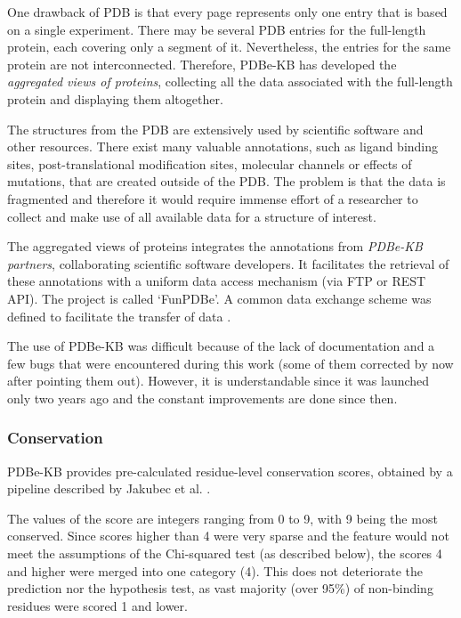 One drawback of PDB is that every page represents only one entry that is based on a single experiment. There may be several PDB entries for the full-length protein, each covering only a segment of it. Nevertheless, the entries for the same protein are not interconnected. Therefore, PDBe-KB has developed the \textit{aggregated views of proteins}, collecting all the data associated with the full-length protein and displaying them altogether.

The structures from the PDB are extensively used by scientific software and other resources. There exist many valuable annotations, such as ligand binding sites, post-translational modification sites, molecular channels or effects of mutations, that are created outside of the PDB. The problem is that the data is fragmented and therefore it would require immense effort of a researcher to collect and make use of all available data for a structure of interest.

The aggregated views of proteins integrates the annotations from \textit{PDBe-KB partners}, collaborating scientific software developers. It facilitates the retrieval of these annotations with a uniform data access mechanism (via FTP or REST API). The project is called `FunPDBe'. A common data exchange scheme was defined to facilitate the transfer of data \cite{pdbekb}.

The use of PDBe-KB was difficult because of the lack of documentation and a few bugs that were encountered during this work (some of them corrected by now after pointing them out). However, it is understandable since it was launched only two years ago and the constant improvements are done since then.

\subsubsection{Conservation}
PDBe-KB provides pre-calculated residue-level conservation scores, obtained by a pipeline described by Jakubec et al. \cite{3dpatch}.

The values of the score are integers ranging from 0 to 9, with 9 being the most conserved. Since scores higher than 4 were very sparse and the feature would not meet the assumptions of the Chi-squared test (as described below), the scores 4 and higher were merged into one category (4). This does not deteriorate the prediction nor the hypothesis test, as vast majority (over 95\%) of non-binding residues were scored 1 and lower.

